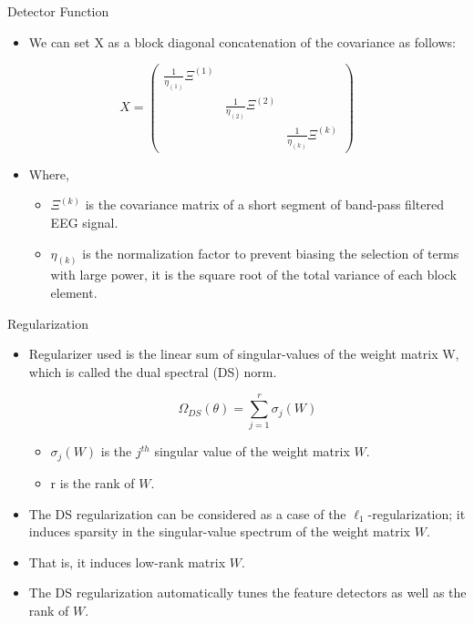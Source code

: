 \documentclass[11pt]{beamer}
\begin{document}
\begin{frame}{Detector Function}
 \begin{itemize}
 \item We can set X as a block diagonal concatenation of the covariance as follows:
 \end{itemize}
 \[ X = \left(\begin{array}{ccc} {\frac{1}{\eta_{\left(1\right)}}\Xi^{\left(1\right)}} &   &  \\   & {\frac{1}{\eta_{\left(2\right)}}\Xi^{\left(2\right)}} &  \\   &   & {\frac{1}{\eta_{\left(k\right)}}\Xi^{\left(k\right)}} \end{array}\right) \]
 \begin{itemize}
 \item Where,
  \begin{itemize}
  \item $\Xi^{\left(k\right)}$ is the covariance matrix of a short segment of band-pass filtered EEG signal.
  \item $\eta_{\left(k\right)}$ is the normalization factor to prevent biasing the selection of terms with large power, it is the square root of the total variance of each block element.
 \end{itemize}
  \end{itemize}
 \end{frame}
\begin{frame}{Regularization}
 \begin{itemize}
    [default]
 \item Regularizer used is the linear sum of singular-values of the weight matrix W, which is called the dual spectral (DS) norm.
 
  \[\Omega_{DS}\left(\theta\right)=\sum_{j=1}^r \sigma_j\left(W\right) \]
  
   \begin{itemize}
   [circle]
 \item $\sigma_j\left(W\right)$ is the $j^{th}$ singular value of the weight matrix $W$.
 \item r is the rank of $W$.
   \end{itemize}
   \item The DS regularization can be considered as a case of the $\ell_1$-regularization; it induces sparsity in the singular-value spectrum of the weight matrix $W$.

   \item That is, it induces low-rank matrix $W$.
    \item The DS regularization automatically tunes the feature detectors as well as the rank of $W$.
 
  \end{itemize}

 \end{frame}
 
\end{document}
